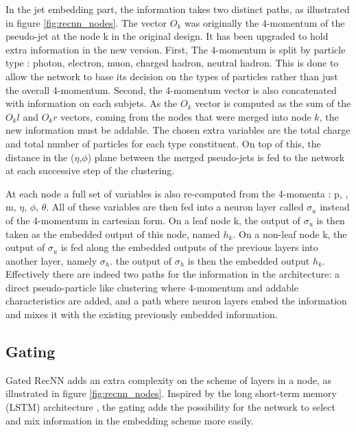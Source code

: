 In the jet embedding part, the information takes two distinct paths, as illustrated in figure \ref{fig:recnn_nodes}.
The vector $O_k$ was originally the 4-momentum of the pseudo-jet at the node k in the original design. It has been upgraded to hold extra information in the new version. First, The 4-momentum is split by particle type : photon, electron, muon, charged hadron, neutral hadron. This is done to allow the network to base its decision on the types of particles rather than just the overall 4-momentum. Second, the 4-momentum vector is also concatenated with information on each subjets. As the $O_k$ vector is computed as the sum of the $O_kl$ and $O_kr$ vectors, coming from the nodes that were merged into node $k$, the new information must be addable. The chosen extra variables are the total charge and total number of particles for each type constituent. On top of this, the distance in the ($\eta$,$\phi$) plane between the merged pseudo-jets is fed to the network at each successive step of the clustering. 

At each node a full set of variables is also re-computed from the 4-momenta : p, \pt, m, $\eta$, $\phi$, $\theta$. All of these variables are then fed into a neuron layer called $\sigma_{u}$ instead of the 4-momentum in cartesian form.
On a leaf node k, the output of $\sigma_{u}$ is then taken as the embedded output of this node, named $h_k$.
On a non-leaf node k, the output of $\sigma_{u}$ is fed along the embedded outputs of the previous layers into another layer, namely $\sigma_h$. the output of $\sigma_h$ is then the embedded output $h_k$.
Effectively there are indeed two paths for the information in the architecture: a direct pseudo-particle like clustering where 4-momentum and addable characteristics are added, and a path where neuron layers embed the information and mixes it with the existing previously embedded information.

\subsection{Gating}

Gated RecNN adds an extra complexity on the scheme of layers in a node, as illustrated in figure \ref{fig:recnn_nodes}. Inspired by the long short-term memory (LSTM) architecture \cite{lstm}, the gating adds the possibility for the network to select and mix information in the embedding scheme more easily. 

